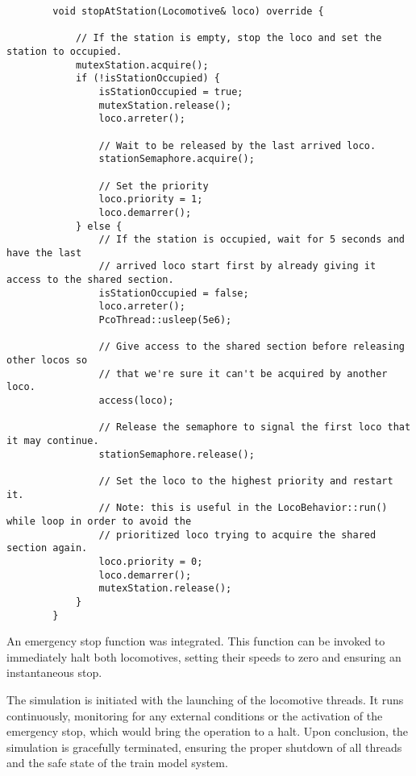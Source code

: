 \documentclass{article}
\begin{document}
    \begin{lstlisting}
        void stopAtStation(Locomotive& loco) override {
    
            // If the station is empty, stop the loco and set the station to occupied.
            mutexStation.acquire();
            if (!isStationOccupied) {
                isStationOccupied = true;
                mutexStation.release();
                loco.arreter();
    
                // Wait to be released by the last arrived loco.
                stationSemaphore.acquire();
    
                // Set the priority
                loco.priority = 1;
                loco.demarrer();
            } else {
                // If the station is occupied, wait for 5 seconds and have the last
                // arrived loco start first by already giving it access to the shared section.
                isStationOccupied = false;
                loco.arreter();
                PcoThread::usleep(5e6);
    
                // Give access to the shared section before releasing other locos so
                // that we're sure it can't be acquired by another loco.
                access(loco);
    
                // Release the semaphore to signal the first loco that it may continue.
                stationSemaphore.release();
    
                // Set the loco to the highest priority and restart it.
                // Note: this is useful in the LocoBehavior::run() while loop in order to avoid the
                // prioritized loco trying to acquire the shared section again.
                loco.priority = 0;
                loco.demarrer();
                mutexStation.release();
            }
        }
    \end{lstlisting}

    An emergency stop function was integrated. This function can be invoked to immediately halt both locomotives, setting their speeds to zero and ensuring an instantaneous stop.

    The simulation is initiated with the launching of the locomotive threads. It runs continuously, monitoring for any external conditions or the activation of the emergency stop, which would bring the operation to a halt. Upon conclusion, the simulation is gracefully terminated, ensuring the proper shutdown of all threads and the safe state of the train model system.
\end{document}

